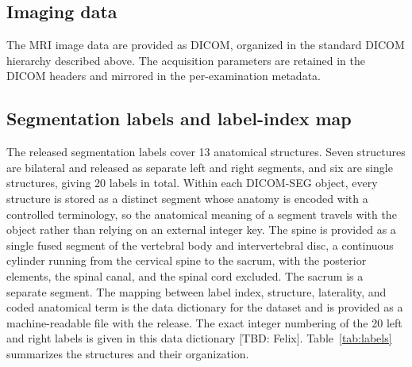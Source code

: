 \subsection*{Imaging data}\label{subsec:imaging}
The MRI image data are provided as DICOM, organized in the standard DICOM hierarchy described above.
The acquisition parameters are retained in the DICOM headers and mirrored in the per-examination metadata.

\subsection*{Segmentation labels and label-index map}\label{subsec:labels}
The released segmentation labels cover 13 anatomical structures.
Seven structures are bilateral and released as separate left and right segments, and six are single structures, giving 20 labels in total.
Within each DICOM-SEG object, every structure is stored as a distinct segment whose anatomy is encoded with a controlled terminology, so the anatomical meaning of a segment travels with the object rather than relying on an external integer key.
The spine is provided as a single fused segment of the vertebral body and intervertebral disc, a continuous cylinder running from the cervical spine to the sacrum, with the posterior elements, the spinal canal, and the spinal cord excluded.
The sacrum is a separate segment.
The mapping between label index, structure, laterality, and coded anatomical term is the data dictionary for the dataset and is provided as a machine-readable file with the release.
The exact integer numbering of the 20 left and right labels is given in this data dictionary [TBD: Felix].
Table~\ref{tab:labels} summarizes the structures and their organization.

